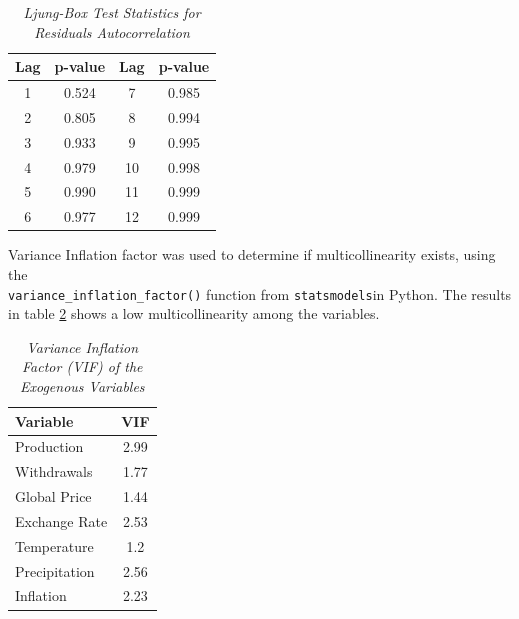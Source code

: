 \documentclass[11pt]{article}
\begin{document}
\begin{table}[H]
    \caption{\textit{Ljung-Box Test Statistics for Residuals Autocorrelation}}
    \label{ljungbox}
    \centering
    \begin{tabular}{cc|cc}
        \toprule
        Lag  & p-value & Lag & p-value  \\
        \midrule
        1  & 0.524 &  7 & 0.985 \\
        2  & 0.805 &  8 & 0.994 \\
        3  & 0.933 &  9 & 0.995 \\
        4  & 0.979 & 10 & 0.998 \\
        5  & 0.990 & 11 & 0.999 \\
        6  & 0.977 & 12 & 0.999 \\
        \bottomrule
    \end{tabular}
\end{table}

Variance Inflation factor was used to determine if multicollinearity exists, using the \texttt{\\ variance\_inflation\_factor()} function from \texttt{statsmodels}in Python. The results in table \ref{vif} shows a low multicollinearity among the variables. 
\begin{table}[H]
    \caption{\textit{Variance Inflation Factor (VIF) of the Exogenous Variables}}
    \label{vif}
    \centering
    \begin{tabular}{lc}
        \toprule
        Variable & VIF  \\
        \midrule
      Production  &  2.99 \\
      Withdrawals  &  1.77 \\
      Global Price  &  1.44     \\ 
      Exchange Rate  &   2.53    \\ 
      Temperature  &   1.2    \\ 
      Precipitation  &   2.56   \\
      Inflation &   2.23    \\ 
        \bottomrule
    \end{tabular}
\end{table}
\end{document}
